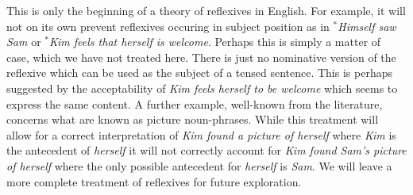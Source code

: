 This is only the beginning of a theory of
reflexives in English.  For example, it will not on its own prevent reflexives
occuring in subject position as in \textit{$^*$Himself saw Sam} or
\textit{$^*$Kim feels that herself is welcome}. Perhaps this is simply
a matter of case, which we have not treated here.  There is just no
nominative version of the reflexive which can be used as the subject
of a tensed sentence.  This is perhaps suggested by the acceptability
of \textit{Kim feels herself to be welcome} which seems to express the
same content.
A further example, well-known from the literature, concerns what are
known as picture noun-phrases.  While this treatment will allow for a correct
interpretation of \textit{Kim found a picture of herself} where
\textit{Kim} is the antecedent of \textit{herself} it will not
correctly account for \textit{Kim found Sam's picture of herself}
where the only possible antecedent for \textit{herself} is
\textit{Sam}.  We will leave a more complete treatment of reflexives for future exploration.






 
